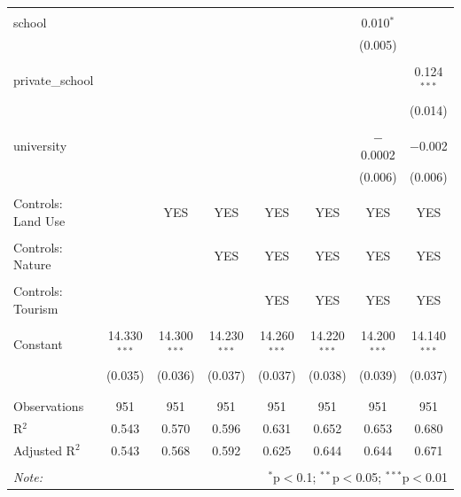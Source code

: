 \documentclass{article}
\begin{document}
\begin{table}[H]
\begin{tabular}{@{\extracolsep{-10pt}}lccccccc}
  & & & & & & & \\ 
 school &  &  &  &  &  & 0.010$^{*}$ &  \\ 
  &  &  &  &  &  & (0.005) &  \\ 
  & & & & & & & \\ 
 private\_school &  &  &  &  &  &  & 0.124$^{***}$ \\ 
  &  &  &  &  &  &  & (0.014) \\ 
  & & & & & & & \\ 
 university &  &  &  &  &  & $-$0.0002 & $-$0.002 \\ 
  &  &  &  &  &  & (0.006) & (0.006) \\ 
  & & & & & & & \\ 
 Controls: Land Use &  & YES & YES  & YES  & YES &  YES & YES \\ 
  &  &  &  &  &  &  & \\ 
 Controls: Nature &  &  &  YES & YES  & YES & YES & YES \\ 
  &  &  &  &  &  &  &  \\ 
 Controls: Tourism &  &  &  & YES & YES & YES & YES  \\ 
  &  &  &  &  &  &  & \\ 
 Constant & 14.330$^{***}$ & 14.300$^{***}$ & 14.230$^{***}$ & 14.260$^{***}$ & 14.220$^{***}$ & 14.200$^{***}$ & 14.140$^{***}$ \\ 
  & (0.035) & (0.036) & (0.037) & (0.037) & (0.038) & (0.039) & (0.037) \\ 
  & & & & & & & \\ 
\hline \\[-1.8ex] 
Observations & 951 & 951 & 951 & 951 & 951 & 951 & 951 \\ 
R$^{2}$ & 0.543 & 0.570 & 0.596 & 0.631 & 0.652 & 0.653 & 0.680 \\ 
Adjusted R$^{2}$ & 0.543 & 0.568 & 0.592 & 0.625 & 0.644 & 0.644 & 0.671 \\ 
\hline 
\hline \\[-1.8ex] 
\textit{Note:}  & \multicolumn{7}{r}{$^{*}$p$<$0.1; $^{**}$p$<$0.05; $^{***}$p$<$0.01} \\ 
\end{tabular}
\end{table}
\end{document}
